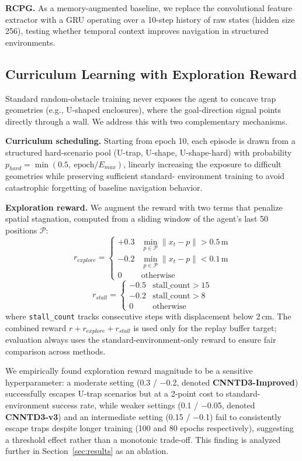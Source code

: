 \textbf{RCPG.} As a memory-augmented baseline, we replace the
convolutional feature extractor with a GRU operating over a 10-step
history of raw states (hidden size 256), testing whether temporal
context improves navigation in structured environments.

\subsection{Curriculum Learning with Exploration Reward}

Standard random-obstacle training never exposes the agent to concave
trap geometries (e.g., U-shaped enclosures), where the goal-direction
signal points directly through a wall. We address this with two
complementary mechanisms.

\textbf{Curriculum scheduling.} Starting from epoch 10, each episode
is drawn from a structured hard-scenario pool
(U-trap, U-shape, U-shape-hard) with probability
$p_{hard} = \min(0.5,\ \text{epoch}/E_{max})$, linearly increasing the
exposure to difficult geometries while preserving sufficient standard-
environment training to avoid catastrophic forgetting of baseline
navigation behavior.

\textbf{Exploration reward.} We augment the reward with two terms that
penalize spatial stagnation, computed from a sliding window of the
agent's last 50 positions $\mathcal{P}$:
\begin{equation}
r_{explore} =
\begin{cases}
+0.3 & \min_{p \in \mathcal{P}} \|x_t - p\| > 0.5\,\text{m} \\
-0.2 & \min_{p \in \mathcal{P}} \|x_t - p\| < 0.1\,\text{m} \\
0 & \text{otherwise}
\end{cases}
\end{equation}
\begin{equation}
r_{stall} =
\begin{cases}
-0.5 & \text{stall\_count} > 15 \\
-0.2 & \text{stall\_count} > 8 \\
0 & \text{otherwise}
\end{cases}
\end{equation}
where \texttt{stall\_count} tracks consecutive steps with displacement
below 2\,cm. The combined reward $r + r_{explore} + r_{stall}$ is used
only for the replay buffer target; evaluation always uses the
standard-environment-only reward to ensure fair comparison across
methods.

We empirically found exploration reward magnitude to be a sensitive
hyperparameter: a moderate setting (0.3 / $-$0.2, denoted
\textbf{CNNTD3-Improved}) successfully escapes U-trap scenarios but at
a 2-point cost to standard-environment success rate, while weaker
settings (0.1 / $-$0.05, denoted \textbf{CNNTD3-v3}) and an
intermediate setting (0.15 / $-$0.1) fail to consistently escape traps
despite longer training (100 and 80 epochs respectively), suggesting a
threshold effect rather than a monotonic trade-off. This finding is
analyzed further in Section~\ref{sec:results} as an ablation.
